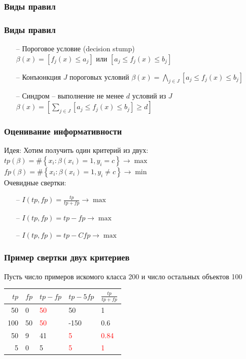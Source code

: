 \documentclass[12pt]{beamer}
\begin{document}
\begin{frame}\frametitle{Виды правил}
\end{frame}

\begin{frame}\frametitle{Виды правил}
\begin{itemize}
\item[--] Пороговое условие (decision stump)\\
$\beta(x) = \left[f_j(x) \leq a_j \right]$ или  $\left[a_j \leq f_j(x) \leq b_j \right]$
\item[--] Конъюнкция $J$ пороговых условий
$\beta(x) = \bigwedge\limits_{j \in J} \left[a_j \leq f_j(x) \leq b_j \right]$
\item[--] Синдром -- выполнение не менее $d$ условий из $J$
$\beta(x) = \left[\sum\limits_{j \in J} \left[a_j \leq f_j(x) \leq b_j \right] \geq d \right]$
\end{itemize}
\end{frame}

\begin{frame}\frametitle{Оценивание информативности}
Идея: Хотим получить один критерий из двух:\\
\vspace{5mm}
${ tp(\beta) = \# \left\{ x_i: \beta(x_i) = 1 , y_i = c \right\} \rightarrow \max  }$ 
${ fp(\beta) = \# \left\{ x_i: \beta(x_i) = 1 , y_i \neq c \right\} \rightarrow \min}$ \\
\vspace{5mm}
	Очевидные свертки:\\
	\begin{itemize}
		\item[--] $I(tp, fp) = \frac{tp}{tp+fp} \rightarrow \max$
		\item[--] $I(tp, fp) = tp-fp \rightarrow \max$
		\item[--] $I(tp, fp) = tp-Cfp \rightarrow \max$			
	\end{itemize}
\end{frame}

\begin{frame}\frametitle{Пример свертки двух критериев}
Пусть число примеров искомого класса 200 и число остальных объектов 100\\
\vspace{5mm}
\begin{tabular}{|r l|l|l|l|}
  \hline 
  $tp$ & $fp$ & $tp-fp$ & $tp-5fp$ & $\frac{tp}{tp+fp}$\\ 
  \hline \hline
  50 & 0 & \textcolor{red}{50} & 50 & 1\\
  \hline
  100 & 50 & \textcolor{red}{50} & -150 & 0.6\\
  \hline \hline
  50 & 9 & 41 & \textcolor{red}{5} & \textcolor{red}{0.84}\\
  \hline  
  5 & 0 & 5 & \textcolor{red}{5} & \textcolor{red}{1}\\  
  \hline 
\end{tabular}
\end{frame}
\end{document}
